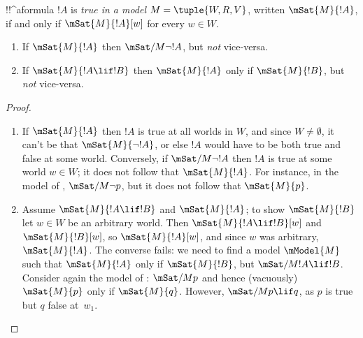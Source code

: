 \documentclass[../../../include/open-logic-section]{subfiles}
\begin{document}


\begin{defn}
  !!^a{formula} $!A$ is \emph{true in a model} $M = \tuple{W, R,
    V}$, written $\mSat{M}{!A}$, if and only if $\mSat{M}{!A}[w]$
  for every $w \in W$.
\end{defn}

\begin{prop}
  \begin{enumerate}
  \item If $\mSat{M}{!A}$ then $\mSat/{M}{\lnot !A}$, but \emph{not}
    vice-versa.
  \item If $\mSat{M}{!A \lif !B}$ then $\mSat{M}{!A}$ only if
    $\mSat{M}{!B}$, but \emph{not} vice-versa.
  \end{enumerate}
\end{prop}

\begin{proof}
  \begin{enumerate}
  \item If $\mSat{M}{!A}$ then $!A$ is true at all worlds in $W$, and
    since $W \neq \emptyset$, it can't be that $\mSat{M}{\lnot!A}$, or
    else $!A$ would have to be both true and false at some
    world. Conversely, if $\mSat/{M}{\lnot !A}$ then $!A$ is true at
    some world $w \in W$; it does not follow that $\mSat{M}{!A}$. For
    instance, in the model of ,
    $\mSat/{M}{\lnot p}$, but it does not follow that $\mSat{M}{p}$.
  \item Assume $\mSat{M}{!A \lif !B}$ and $\mSat{M}{!A}$; to show
    $\mSat{M}{!B}$ let $w \in W$ be an arbitrary world. Then
    $\mSat{M}{!A \lif !B}[w]$ and $\mSat{M}{!B}[w]$, so
    $\mSat{M}{!A}[w]$, and since $w$ was arbitrary,
    $\mSat{M}{!A}$. The converse fails: we need to find a model
    $\mModel{M}$ such that $\mSat{M}{!A}$ only if $\mSat{M}{!B}$, but
    $\mSat/{M}{!A \lif !B}$. Consider again the model of
    : $\mSat/{M}{p}$ and hence (vacuously)
    $\mSat{M}{p}$ only if $\mSat{M}{q}$. However, $\mSat/{M}{p \lif
      q}$, as $p$ is true but $q$ false at~$w_1$.
  \end{enumerate}
\end{proof}
\end{document}
